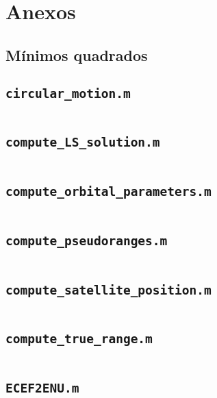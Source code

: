 \section{Anexos}
\subsection{Mínimos quadrados}
\subsection{\texttt{circular\_motion.m}}
\inputminted[fontsize=\footnotesize]{matlab}{code_LS/circular_motion.m}

\subsection{\texttt{compute\_LS\_solution.m}}
\inputminted[fontsize=\footnotesize]{matlab}{code_LS/compute_LS_solution.m}

\subsection{\texttt{compute\_orbital\_parameters.m}}
\inputminted[fontsize=\footnotesize]{matlab}{code_LS/compute_orbital_parameters.m}

\subsection{\texttt{compute\_pseudoranges.m}}
\inputminted[fontsize=\footnotesize]{matlab}{code_LS/compute_pseudoranges.m}

\subsection{\texttt{compute\_satellite\_position.m}}
\inputminted[fontsize=\footnotesize]{matlab}{code_LS/compute_satellite_position.m}

\subsection{\texttt{compute\_true\_range.m}}
\inputminted[fontsize=\footnotesize]{matlab}{code_LS/compute_true_range.m}

\subsection{\texttt{ECEF2ENU.m}}
\inputminted[fontsize=\footnotesize]{matlab}{code_LS/ECEF2ENU.m}

